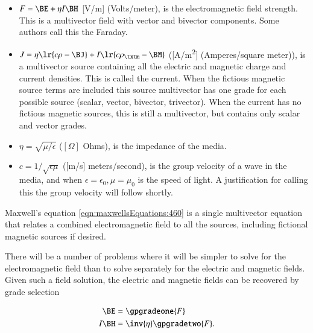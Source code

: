 \begin{itemize}
\item \( F = \BE + \eta I \BH \) [\si{V/m}] (Volts/meter), is the electromagnetic field strength.
This is a multivector field with vector and bivector components.  Some authors call this the Faraday.
\item \( J = \eta \lr{ c \rho - \BJ } + I \lr{ c \rho_\txtm - \BM } \) ([\si{A/m^2}] (Amperes/square meter)),
is a multivector source containing all the electric and magnetic charge and current densities.  This is called the current.
When the fictious magnetic source terms are included this source multivector has one grade for each possible source (scalar, vector, bivector, trivector).  When the current has no fictious magnetic sources, this is still a multivector, but contains only scalar and vector grades.
\item \( \eta = \sqrt{\mu/\epsilon} \) (\( [\Omega] \) Ohms), is the impedance of the media.
\item \( c = 1/\sqrt{\epsilon\mu} \) ([\si{m/s}] meters/second), is the group velocity of a wave in the media, and when \( \epsilon = \epsilon_0, \mu = \mu_0 \) is the speed of light.  
A justification for calling this the group velocity will follow shortly.
\end{itemize}

Maxwell's equation \cref{eqn:maxwellsEquations:460} is a
single multivector equation that relates a combined electromagnetic field to all the sources, including fictional magnetic sources if desired.

There will be a number of problems where it will be simpler to solve for the electromagnetic field than to solve separately for the electric and magnetic fields.
Given such a field solution, the electric and magnetic fields can be recovered by grade selection

\begin{dmath}\label{eqn:isotropicMaxwells:480}
\begin{aligned}
\BE &= \gpgradeone{F} \\
I \BH &= \inv{\eta} \gpgradetwo{F}.
\end{aligned}
\end{dmath}
